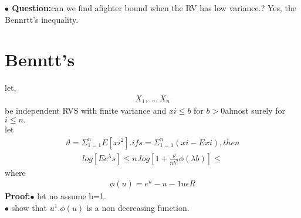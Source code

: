 \documentclass[journal,12pt,twocolumn]{IEEEtran}
\begin{document}
\textbf{$\bullet$ Question:}can we find afighter bound when the RV has low  variance.? Yes, the Bennrtt's inequality.\\

\section{Benntt's}
 let,\\
\begin{align}
X_1, \dots, X_n
\end{align}
be independent RVS with finite variance and $xi \leqslant b$ for $b >0$almost surely for $i\leqslant n.$\\
let
\begin{align}
\vartheta =\Sigma_{1=1}^{n} E[xi^2]. if s=\Sigma_{1=1}^{n}(xi-E xi),then
\end{align}
\begin{align}
log{[Ee^\lambda s]} \leqslant n.log {[1+\frac{\vartheta}{nb^2}\phi (\lambda b)]}\leqslant 
\end{align}
where
\begin{align}
\phi (u)=e^{u}-u-1 u\epsilon R
\end{align}
\textbf{Proof:}$\bullet$ let no assume b=1.\\

$\bullet$ show that $u^1$.$\phi(u)$ is a non decreasing function. \\
\end{document}
